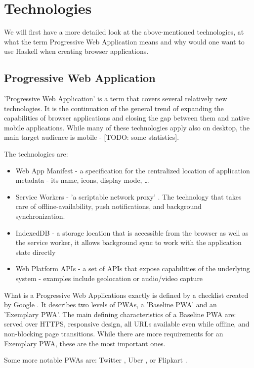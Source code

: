 \documentclass[english,odsaz]{fitthesis}
\begin{document}
\chapter{Technologies}
\label{sec:orgd3eb7e1}
We will first have a more detailed look at the above-mentioned technologies, at
what the term Progressive Web Application means and why would one want to use
Haskell when creating browser applications.

\section{Progressive Web Application}
\label{sec:org05b11da}
'Progressive Web Application' is a term that covers several relatively new
technologies. It is the continuation of the general trend of expanding the
capabilities of browser applications and closing the gap between them and native
mobile applications. While many of these technologies apply also on desktop, the
main target audience is mobile - [TODO: some statistics].

The technologies are:
\begin{itemize}
\item Web App Manifest - a specification for the centralized location of application
metadata - its name, icons, display mode, \ldots{}
\item Service Workers - 'a scriptable network proxy' \cite{mdn_svcwrk}. The
technology that takes care of offline-availability, push notifications, and
background synchronization.
\item IndexedDB - a storage location that is accessible from the browser as well as
the service worker, it allows background sync to work with the application
state directly
\item Web Platform APIs - a set of APIs that expose capabilities of the underlying
system - examples include geolocation or
audio/video capture \cite{what_web_can_do}
\end{itemize}

What is a Progressive Web Applications exactly is defined by a checklist created
by Google \cite{pwa_checklist}. It describes two levels of PWAs, a 'Baseline PWA'
and an 'Exemplary PWA'. The main defining characteristics of a Baseline PWA are:
served over HTTPS, responsive design, all URLs available even while offline, and
non-blocking page transitions. While there are more requirements for an
Exemplary PWA, these are the most important ones.

Some more notable PWAs are: Twitter \cite{twitter}, Uber \cite{uber}, or Flipkart
\cite{flipkart}.
\end{document}
